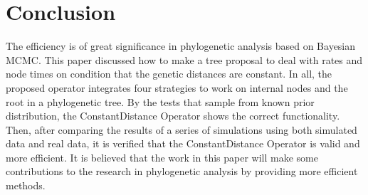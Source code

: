 \documentclass{bmcart}
\begin{document}
\section*{Conclusion}
The efficiency is of great significance in phylogenetic analysis based on Bayesian MCMC. This paper discussed how to make a tree proposal to deal with rates and node times on condition that the genetic distances are constant. In all, the proposed operator integrates four strategies to work on internal nodes and the root in a phylogenetic tree. By the tests that sample from known prior distribution, the ConstantDistance Operator shows the correct functionality. Then, after comparing the results of a series of simulations using both simulated data and real data, it is verified that the ConstantDistance Operator is valid and more efficient. It is believed that the work in this paper will make some contributions to the research in phylogenetic analysis by providing more efficient methods.
\end{document}
